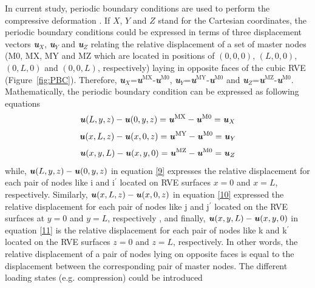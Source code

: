 \documentclass[review]{elsarticle}
\begin{document}
In current study, periodic boundary conditions are used to perform the compressive deformation \citep{HUET1990813,Segurado20022107}. If $X$, $Y$ and $Z$ stand for the Cartesian coordinates, the periodic boundary conditions could be expressed in terms of three displacement vectors \textbf{\textit{u}}$_X$, \textbf{\textit{u}}$_Y$ and \textbf{\textit{u}}$_Z$ relating the relative displacement of a set of master nodes (M0, MX, MY and MZ which are located in positions of $(0,0,0)$, $(L,0,0)$, $(0,L,0)$ and $(0,0,L)$, respectively) laying in opposite faces of the cubic RVE (Figure~\ref{fig:PBC}). Therefore, \textbf{\textit{u}}$_X$=\textbf{\textit{u}}$^\mathrm{MX}$-\textbf{\textit{u}}$^\mathrm{M0}$, \textbf{\textit{u}}$_Y$=\textbf{\textit{u}}$^\mathrm{MY}$-\textbf{\textit{u}}$^\mathrm{M0}$ and \textbf{\textit{u}}$_Z$=\textbf{\textit{u}}$^\mathrm{MZ}$-\textbf{\textit{u}}$^\mathrm{M0}$. Mathematically, the periodic boundary condition can be expressed as following equations
\begin{equation}
\textbf{\textit{u}}(L,y,z)-\textbf{\textit{u}}(0,y,z)=\textbf{\textit{u}}^\mathrm{MX}-\textbf{\textit{u}}^\mathrm{M0}=\textbf{\textit{u}}_X
\label{9}
\end{equation}
\begin{equation}
\textbf{\textit{u}}(x,L,z)-\textbf{\textit{u}}(x,0,z)=\textbf{\textit{u}}^\mathrm{MY}-\textbf{\textit{u}}^\mathrm{M0}=\textbf{\textit{u}}_Y
\label{10}
\end{equation}
\begin{equation}
\textbf{\textit{u}}(x,y,L)-\textbf{\textit{u}}(x,y,0)=\textbf{\textit{u}}^\mathrm{MZ}-\textbf{\textit{u}}^\mathrm{M0}=\textbf{\textit{u}}_Z
\label{11}
\end{equation}
while, $\textbf{\textit{u}}(L,y,z)-\textbf{\textit{u}}(0,y,z)$ in equation \ref{9} expresses the relative displacement for each pair of nodes like 
i and  i$^\prime$ located on RVE surfaces $x=0$ and $x=L$, respectively. Similarly, $\textbf{\textit{u}}(x,L,z)-\textbf{\textit{u}}(x,0,z)$ in equation \ref{10} expressed the relative displacement for each pair of nodes like j and j$^\prime$ located on the RVE surfaces at $y=0$ and $y=L$, respectively , and finally, $\textbf{\textit{u}}(x,y,L)-\textbf{\textit{u}}(x,y,0)$ in equation \ref{11} is the relative displacement 
for each pair of nodes like k and k$^\prime$  located on the RVE surfaces $z=0$ and $z=L$, respectively.  In other words, 
the relative displacement of a pair of nodes lying on opposite faces is equal to the displacement between 
the corresponding pair of master nodes. The different loading states (e.g. compression) could be introduced 
\end{document}
